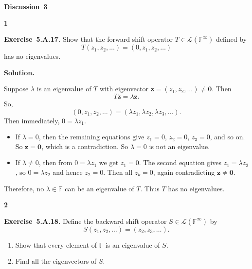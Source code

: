 \documentclass[11pt]{article}
\newcommand{\AssignmentType}{Discussion}
\newcommand{\AssignmentNumber}{3}
\newcommand{\ProblemDivider}[1]{%
  \vspace{1.0em}
  \noindent\textbf{#1}\par
  \vspace{0.35em}
}
\newcommand{\ProblemAnnounce}{\noindent}
\newcommand{\SolutionAnnounce}{\noindent\textbf{Solution.}\par\medskip}
\newcommand{\Exercise}[1]{\textbf{Exercise~#1.}\;}
\newcommand{\F}{\mathbb{F}}
\begin{document}
\begin{center}
  {\Large \textbf{\AssignmentType~\AssignmentNumber}}
\end{center}
\vspace{0.75em}

\ProblemDivider{1}

\begin{problemBox}
\ProblemAnnounce
\Exercise{5.A.17}
Show that the forward shift operator \(T \in \mathcal{L}(\F^{\infty})\) defined by
\[
T(z_1, z_2, \ldots) = (0, z_1, z_2, \ldots)
\]
has no eigenvalues.
\end{problemBox}

\begin{solutionBox}
\SolutionAnnounce
\doublespacing
Suppose \(\lambda\) is an eigenvalue of \(T\) with eigenvector \(\mathbf{z} = (z_1, z_2, \dots) \neq \mathbf{0}\). Then
\[
T\mathbf{z} = \lambda \mathbf{z}.
\]
So, 
\[
(0, z_1, z_2, \dots) = (\lambda z_1, \lambda z_2, \lambda z_3, \dots).
\]
Then immediately, \(0 = \lambda z_1\).

\begin{itemize}
    \item If \(\lambda = 0\), then the remaining equations give \(z_1 = 0\), \(z_2 = 0\), \(z_3 = 0\), and so on. So \(\mathbf{z} = \mathbf{0}\), which is a contradiction. So \(\lambda = 0\) is not an eigenvalue.
    \item If \(\lambda \neq 0\), then from \(0 = \lambda z_1\) we get \(z_1 = 0\). The second equation gives \(z_1 = \lambda z_2\), so \(0 = \lambda z_2\) and hence \(z_2 = 0\). Then all \(z_k = 0\), again contradicting \(\mathbf{z} \neq \mathbf{0}\).
\end{itemize}
Therefore, no \(\lambda \in \F\) can be an eigenvalue of \(T\). Thus \(T\) has no eigenvalues.
\end{solutionBox}

\newpage
\ProblemDivider{2}

\begin{problemBox}
\ProblemAnnounce
\Exercise{5.A.18}
Define the backward shift operator \(S \in \mathcal{L}(\F^{\infty})\) by
\[
S(z_1, z_2, \dots) = (z_2, z_3, \dots).
\]
\begin{enumerate}
    \item Show that every element of \(\F\) is an eigenvalue of \(S\).
    \item Find all the eigenvectors of \(S\).
\end{enumerate}
\end{problemBox}
\end{document}
